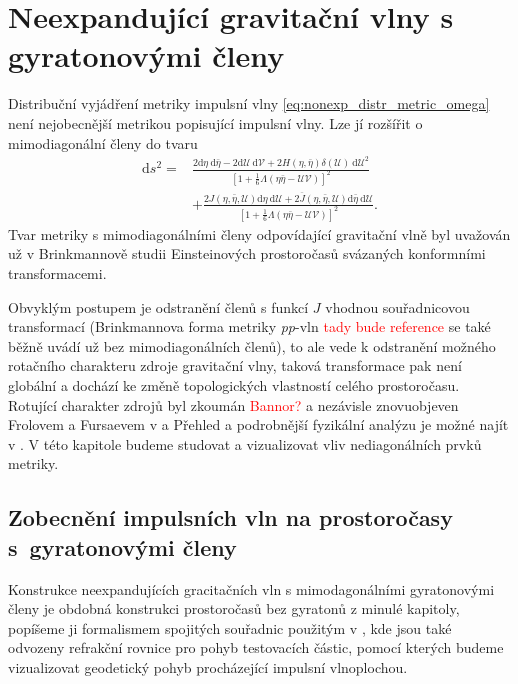 \chapter{Neexpandující gravitační vlny s gyratonovými členy}
\label{chap:kap03}
Distribuční vyjádření metriky impulsní vlny \eqref{eq:nonexp_distr_metric_omega} není nejobecnější metrikou popisující
impulsní vlny. Lze jí rozšířit o mimodiagonální členy do tvaru
\begin{equation}
    \label{eq:nonexp_gyra_distrib_metric_omega}
    \begin{split}
        \mathrm{d}s^2=&\frac{2\mathrm{d}\eta~\mathrm{d}\bar{\eta} - 2 \mathrm{d}\mathcal{U}~\mathrm{d}\mathcal{V} + 2H(\eta, \bar{\eta}) \delta(\mathcal{U}) 
        ~\mathrm{d}\mathcal{U}^2}{\left[1+\frac{1}{6}\Lambda(\eta \bar{\eta}-\mathcal{U}\mathcal{V})\right]^2} \\
        &+ \frac{2J\left(\eta, \bar{\eta}, \mathcal{U}\right) \mathrm{d}\eta~\mathrm{d}\mathcal{U}
        +2\overline{J}\left(\eta, \bar{\eta}, \mathcal{U}\right) \mathrm{d}\bar{\eta}~\mathrm{d}\mathcal{U}}{\left[1+\frac{1}{6}\Lambda(\eta \bar{\eta}-\mathcal{U}\mathcal{V})\right]^2}.
    \end{split}
\end{equation}
Tvar metriky s mimodiagonálními členy odpovídající gravitační vlně byl uvažován už v Brinkmannově studii \cite{Brinkmann1925} Einsteinových prostoročasů svázaných konformními transformacemi.

Obvyklým postupem je odstranění členů s funkcí $J$ vhodnou souřadnicovou transformací (Brinkmannova forma metriky \emph{pp}-vln \textcolor{red}{tady bude reference} se také běžně uvádí už bez mimodiagonálních členů), to ale vede k odstranění
možného rotačního charakteru zdroje gravitační vlny, taková transformace pak není globální a dochází ke změně topologických vlastností celého prostoročasu.
Rotující charakter zdrojů byl zkoumán \textcolor{red}{Bannor?} a nezávisle znovuobjeven Frolovem a Fursaevem v \cite{Frolov2005_0} a \cite{Frolov2005} Přehled a podrobnější
fyzikální analýzu je možné najít v \cite{Podolsky2014}.
V této kapitole budeme studovat a vizualizovat vliv nediagonálních prvků metriky.

\section{Zobecnění impulsních vln na prostoročasy s~gyratonovými členy}
Konstrukce neexpandujících gracitačních vln s mimodagonálními gyratonovými členy je obdobná konstrukci prostoročasů bez gyratonů z minulé kapitoly, popíšeme ji formalismem spojitých souřadnic
použitým v \cite{Podolsky_2017}, kde jsou také odvozeny refrakční rovnice pro pohyb testovacích částic, pomocí kterých budeme vizualizovat geodetický pohyb procházející impulsní vlnoplochou.

